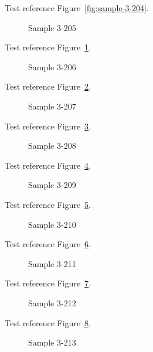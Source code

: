 Test reference Figure~\ref{fig:sample-3-204}.

\begin{figure}[tbhp]
\caption{Sample 3-205}
\label{fig:sample-3-205}
\end{figure}

Test reference Figure~\ref{fig:sample-3-205}.

\begin{figure}[tbhp]
\caption{Sample 3-206}
\label{fig:sample-3-206}
\end{figure}

Test reference Figure~\ref{fig:sample-3-206}.

\begin{figure}[tbhp]
\caption{Sample 3-207}
\label{fig:sample-3-207}
\end{figure}

Test reference Figure~\ref{fig:sample-3-207}.

\begin{figure}[tbhp]
\caption{Sample 3-208}
\label{fig:sample-3-208}
\end{figure}

Test reference Figure~\ref{fig:sample-3-208}.

\begin{figure}[tbhp]
\caption{Sample 3-209}
\label{fig:sample-3-209}
\end{figure}

Test reference Figure~\ref{fig:sample-3-209}.

\begin{figure}[tbhp]
\caption{Sample 3-210}
\label{fig:sample-3-210}
\end{figure}

Test reference Figure~\ref{fig:sample-3-210}.

\begin{figure}[tbhp]
\caption{Sample 3-211}
\label{fig:sample-3-211}
\end{figure}

Test reference Figure~\ref{fig:sample-3-211}.

\begin{figure}[tbhp]
\caption{Sample 3-212}
\label{fig:sample-3-212}
\end{figure}

Test reference Figure~\ref{fig:sample-3-212}.

\begin{figure}[tbhp]
\caption{Sample 3-213}
\label{fig:sample-3-213}
\end{figure}

